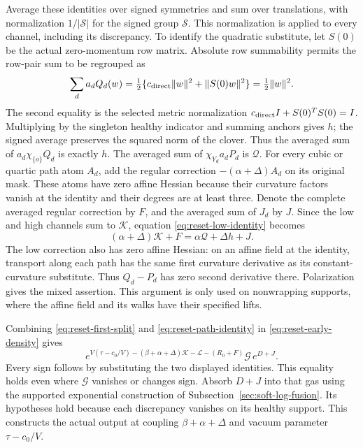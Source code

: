 Average these identities over signed symmetries and sum over
translations, with normalization $1/|\mathcal S|$ for the signed group
$\mathcal S$. This normalization is applied to every channel, including
its discrepancy. To identify the quadratic substitute, let $S(0)$ be the actual
zero-momentum row matrix. Absolute row summability permits the
row-pair sum to be regrouped as
\[
 \sum_d a_d Q_d(w)
   =\tfrac12\{c_{\rm direct}\|w\|^2+\|S(0)w\|^2\}
   =\tfrac12\|w\|^2.
\]
The second equality is the selected metric normalization
$c_{\rm direct}I+S(0)^TS(0)=I$. Multiplying by the singleton healthy
indicator and summing anchors gives $h$; the signed average preserves
the squared norm of the clover. Thus the averaged sum of
$a_d\chi_{\{o\}}Q_d$ is exactly $h$. The averaged sum of
$\chi_{Y_d}a_dP_d$ is $\mathcal Q$.
For every cubic or quartic path atom $A_d$, add the regular correction
$-(\alpha+\Delta)A_d$ on its original mask. These atoms have zero
affine Hessian because their curvature factors vanish at the identity
and their degrees are at least three. Denote the complete averaged
regular correction by $F$, and the averaged sum of $J_d$ by $J$.
Since the low and high channels sum to $\mathcal K$, equation
\eqref{eq:reset-low-identity} becomes
\begin{equation}\label{eq:reset-path-identity}
       (\alpha+\Delta)\mathcal K+F
                              =\alpha\mathcal Q+\Delta h+J.
\end{equation}
The low correction also has zero affine Hessian: on an affine field
at the identity, transport along each path has the same first
curvature derivative as its constant-curvature substitute. Thus
$Q_d-P_d$ has zero second derivative there. Polarization gives the
mixed assertion. This argument is only used on nonwrapping supports,
where the affine field and its walks have their specified lifts.

Combining \eqref{eq:reset-first-split} and
\eqref{eq:reset-path-identity} in \eqref{eq:reset-early-density} gives
\begin{equation}\label{eq:reset-complete-density}
 e^{V(\tau-c_0/V)-(\beta+\alpha+\Delta)\mathcal K
                          -\mathcal L-(R_0+F)}
                                     \mathcal G\,e^{D+J}.
\end{equation}
Every sign follows by substituting the two displayed identities.
This equality holds even where $\mathcal G$ vanishes or changes sign.
Absorb $D+J$ into that gas using the supported exponential construction
of Subsection~\ref{sec:soft-log-fusion}. Its hypotheses hold because each
discrepancy vanishes on its healthy support. This constructs the actual
output at coupling $\beta+\alpha+\Delta$ and vacuum parameter
$\tau-c_0/V$.

